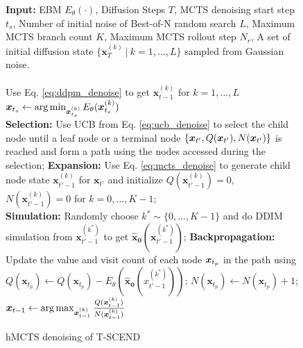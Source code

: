 \begin{figure}[t]
\centering
\small
\vspace{-5pt}
\begin{minipage}{0.9\linewidth}
    \begin{algorithm}[H]
        \vspace{-2pt}
        \caption{hMCTS denoising of T-SCEND}
        \label{alg:hmcts}
        \begin{algorithmic}[1]
            \STATE \textbf{Input:} EBM $E_\theta(\cdot)$, Diffusion Steps $T$, MCTS denoising start step $t_s$, Number of initial noise of Best-of-N random search $L$, Maximum MCTS branch count $K$, Maximum MCTS rollout step $N_r$, A set of initial diffusion state $\{\boldsymbol{x}_T^{(k)}\ |\ k=1,...,L\}$ sampled from Gaussian noise. \\
        \\
            \STATE Use Eq. \ref{eq:ddpm_denoise} to get $\boldsymbol{x}_{t-1}^{(k)}$ for $k = 1,...,L$
        \ENDFOR \\ 
        ${\boldsymbol{x}}_{t_s}\gets \operatorname*{arg\,min}_{{\boldsymbol{x}}_{t_s}^{(k)}}E_\theta({\boldsymbol{x}}_{t_s}^{(k)})$ \\
            \STATE \textbf{Selection:} Use UCB from Eq. \ref{eq:ucb_denoise} to select the child node until a leaf node or a terminal node $\{\boldsymbol{x}_{t'}, Q({\boldsymbol{x}}_{t'}), N({\boldsymbol{x}}_{t'})\}$ is reached and form a path using the nodes accessed during the selection;
            \STATE \textbf{Expansion:} Use Eq. \ref{eq:mcts_denoise} to generate child node state $\boldsymbol{x}_{t'-1}^{(k)}$ for $\boldsymbol{x}_{t'}$ and initialize $Q(\boldsymbol{x}_{t'-1}^{(k)}) = 0$, $N(\boldsymbol{x}_{t'-1}^{(k)}) = 0$ for $k = 0,...,K-1$; \\
            \STATE \textbf{Simulation:} Randomly choose $k^*\sim \{0,...,K-1\}$ and do DDIM simulation from $\boldsymbol{x}_{t'-1}^{(k^*)}$ to get $\boldsymbol{\hat{x}_0}(\boldsymbol{x}_{t'-1}^{(k^*)})$;
                \STATE \textbf{Backpropagation:} Update the value and visit count of each node ${\boldsymbol{x}}_{t_p}$ in the path using $Q(\boldsymbol{x}_{t_p}) \gets Q(\boldsymbol{x}_{t_p}) - E_\theta(\boldsymbol{\hat{x}_0}(x_{t'-1}^{(k^*)}))$;
                \STATE \quad $N(\boldsymbol{x}_{t_p}) \gets N(\boldsymbol{x}_{t_p}) + 1$;
            \ENDFOR \\
            \STATE ${\boldsymbol{x}}_{t-1}\gets\operatorname*{arg\,max}_{{\boldsymbol{x}}_{t-1}^{(k)}}\frac{Q({\boldsymbol{x}}_{t-1}^{(k)})}{N({\boldsymbol{x}}_{t-1}^{(k)})}$
        \ENDFOR \\


\end{algorithmic}
\end{algorithm}
\end{minipage}
\end{figure}
